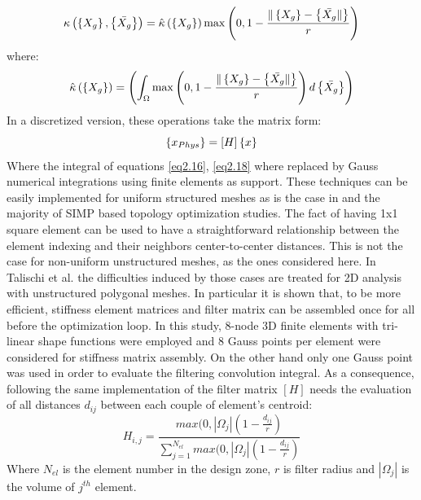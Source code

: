  \begin{equation}
 \kappa\left(\left\lbrace{X_g}\right \rbrace,\left\lbrace{\bar{X_g}}\right \rbrace\right)=\hat{\kappa}\left(\left\lbrace{X_g}\right \rbrace\right) \max\left(0,1-\frac{\|\left\lbrace{X_g}\right \rbrace-\left\lbrace{\bar{X_g} \|}\right \rbrace}{r} \right)
 \end{equation}
 where:
 \begin{equation}
 \label{eq2.18}
\hat{\kappa}\left(\left\lbrace{X_g}\right \rbrace\right)=\left( \int_{\Omega}{\max\left(0,1-\frac{\|\left\lbrace{X_g}\right \rbrace-\left\lbrace{\bar{X_g} \|}\right \rbrace}{r} \right)d\left\lbrace{\bar{X_g}}\right \rbrace} \right)
 \end{equation}
 In a discretized version, these operations take the matrix form:
 \begin{equation}
 \left\lbrace{x_{Phys}}\right \rbrace=\left[{H}\right]\left\lbrace{x}\right \rbrace
 \end{equation}
 Where the integral of equations \ref{eq2.16}, \ref{eq2.18} where replaced by Gauss numerical integrations using finite elements as support. 
 These techniques can be easily implemented for uniform structured meshes as is the case in \cite{andreassen2011efficient} and the majority of SIMP based topology optimization studies. 
 The fact of having 1x1 square element can be used to have a straightforward relationship between the element indexing and their neighbors center-to-center distances.  This is not the case for non-uniform unstructured meshes, as the ones considered here. In Talischi et al. \cite{talischi2012polytop} the difficulties induced by those cases are treated for 2D analysis with unstructured polygonal meshes. In particular it is shown that, to be more efficient, stiffness element matrices and  filter matrix can be assembled once for all before the optimization loop. In this study, 8-node 3D finite elements with tri-linear shape functions were employed and 8 Gauss points per element were considered for stiffness matrix assembly. On the other hand only one Gauss point was used in order to evaluate the filtering convolution integral. As a consequence, following the same implementation of \cite{talischi2012polytop} the filter matrix $\left[H\right]$ needs the evaluation of all distances $d_{ij}$ between each couple of element's centroid:
 \begin{equation}
 \label{e.11}
 H_{i,j} = \frac{max(0,| \Omega_j| (1-\frac{d_{ij}}{r})}{\sum_{j=1}^{N_{el}}max(0,| \Omega_j| (1-\frac{d_{ij}}{r})}
 \end{equation}
 Where $N_{el}$ is the element number in the design zone, $r$ is filter radius and $| \Omega_j|$ is the volume of $j^{th}$ element.
